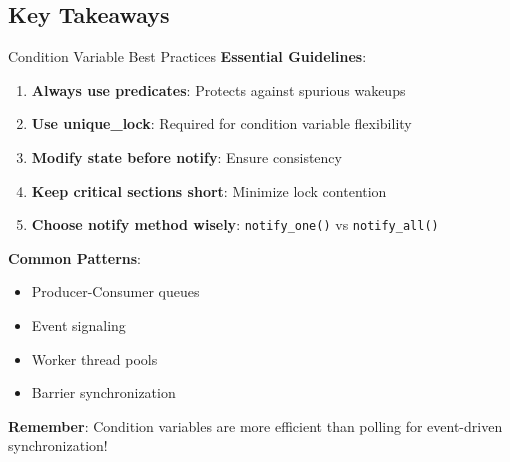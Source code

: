 \subsection{Key Takeaways}
\begin{frame}{Condition Variable Best Practices}
	\textbf{Essential Guidelines}:
	\begin{enumerate}
		\item \textbf{Always use predicates}: Protects against spurious wakeups
		\item \textbf{Use unique\_lock}: Required for condition variable flexibility
		\item \textbf{Modify state before notify}: Ensure consistency
		\item \textbf{Keep critical sections short}: Minimize lock contention
		\item \textbf{Choose notify method wisely}: \texttt{notify\_one()} vs \texttt{notify\_all()}
	\end{enumerate}

	\vspace{1em}
	\textbf{Common Patterns}:
	\begin{itemize}
		\item Producer-Consumer queues
		\item Event signaling
		\item Worker thread pools
		\item Barrier synchronization
	\end{itemize}

	\vspace{1em}
	\textbf{Remember}: Condition variables are more efficient than polling for event-driven synchronization!
\end{frame}
